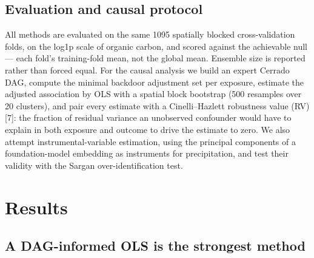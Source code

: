 \documentclass[10pt,letterpaper]{article}
\begin{document}
\subsection{Evaluation and causal
protocol}\label{evaluation-and-causal-protocol}

All methods are evaluated on the same 1095 spatially blocked
cross-validation folds, on the log1p scale of organic carbon, and scored
against the achievable null --- each fold's training-fold mean, not the
global mean. Ensemble size is reported rather than forced equal. For the
causal analysis we build an expert Cerrado DAG, compute the minimal
backdoor adjustment set per exposure, estimate the adjusted association
by OLS with a spatial block bootstrap (500 resamples over 20 clusters),
and pair every estimate with a Cinelli--Hazlett robustness value (RV)
{[}7{]}: the fraction of residual variance an unobserved confounder
would have to explain in both exposure and outcome to drive the estimate
to zero. We also attempt instrumental-variable estimation, using the
principal components of a foundation-model embedding as instruments for
precipitation, and test their validity with the Sargan
over-identification test.

\section{Results}\label{results}

\subsection{A DAG-informed OLS is the strongest
method}\label{a-dag-informed-ols-is-the-strongest-method}
\end{document}

